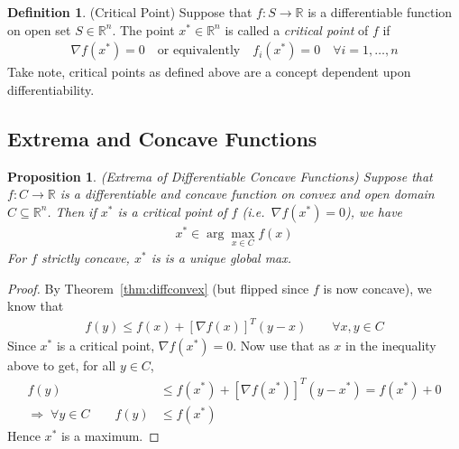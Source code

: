 \documentclass[12pt]{article}
\numberwithin{equation}{section} %
\theoremstyle{plain}
\newtheorem{prop}[thm]{Proposition}
\theoremstyle{definition}
\newtheorem{defn}[thm]{Definition}
\theoremstyle{remark}
\newcommand{\R}{\mathbb{R}}
\newcommand{\Rn}{\mathbb{R}^n}
\begin{document}
\begin{defn}{(Critical Point)}
Suppose that $f:S\rightarrow\R$ is a differentiable function on open set
$S\in\Rn$. The point $x^*\in\Rn$ is called a \emph{critical
point} of $f$ if
\begin{align*}
  \nabla f(x^*) = 0
  \quad\text{or equivalently}\quad
  f_i(x^*)=0
  \quad\forall i=1,\ldots,n
\end{align*}
Take note, critical points as defined above are a concept dependent upon
differentiability.
\end{defn}

\subsection{Extrema and Concave Functions}
\label{sec:extrema-concave}

\begin{prop}{\emph{(Extrema of Differentiable Concave Functions)}}
Suppose that $f:C\rightarrow\R$ is a differentiable and concave function
on convex and open domain $C\subseteq\Rn$. Then if $x^*$ is a critical
point of $f$ (i.e.\ $\nabla f(x^*)=0$), we have
\begin{align*}
  x^* \in \arg\max_{x\in C} f(x)
\end{align*}
For $f$ \emph{strictly} concave, $x^*$ is is a \emph{unique} global max.
\end{prop}
\begin{proof}
By Theorem~\ref{thm:diffconvex} (but flipped since $f$ is now concave),
we know that
\begin{align*}
  f(y) \leq f(x) + [\nabla f(x)]^T (y-x)
  \qquad \forall x,y\in C
\end{align*}
Since $x^*$ is a critical point, $\nabla f(x^*)=0$. Now use that as $x$
in the inequality above to get, for all $y\in C$,
\begin{align*}
  f(y) &\leq f(x^*) + [\nabla f(x^*)]^T (y-x^*)
  = f(x^*) + 0\\
  \Rightarrow\; \forall y\in C\qquad
  f(y) &\leq f(x^*)
\end{align*}
Hence $x^*$ is a maximum.
\end{proof}
\end{document}
